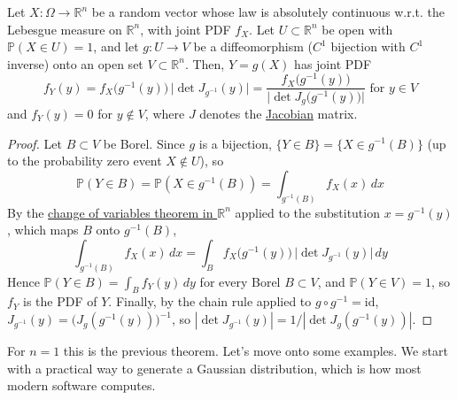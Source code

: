   \begin{theorem}
    \label{thm:density-of-a-multivariate-transformation}
    Let $X: \Omega \to \mathbb{R}^n$ be a random vector whose law is absolutely continuous w.r.t. the Lebesgue measure on $\mathbb{R}^n$, with joint PDF $f_{X}$. Let $U \subset \mathbb{R}^n$ be open with $\mathbb{P}(X \in U) = 1$, and let $g: U \to V$ be a diffeomorphism ($C^1$ bijection with $C^1$ inverse) onto an open set $V \subset \mathbb{R}^n$. Then, $Y = g(X)$ has joint PDF 
    \begin{equation}
      f_{Y} (y) = f_{X} \big( g^{-1} (y) \big) \, \big| \det J_{g^{-1}} (y) \big| = \frac{f_{X} \big( g^{-1} (y) \big)}{\big| \det J_g \big( g^{-1} (y) \big) \big|} \text{ for } y \in V
    \end{equation}
    and $f_{Y} (y) = 0$ for $y \not\in V$, where $J$ denotes the \hyperref[mv-def:jacobian]{Jacobian} matrix. 
  \end{theorem}
  \begin{proof}
    Let $B \subset V$ be Borel. Since $g$ is a bijection, $\{Y \in B\} = \{X \in g^{-1}(B)\}$ (up to the probability zero event $X \notin U$), so 
    \begin{equation}
      \mathbb{P}(Y \in B) = \mathbb{P}(X \in g^{-1}(B)) = \int_{g^{-1}(B)} f_{X} (x) \,dx
    \end{equation}
    By the \hyperref[mv-thm:integration-over-change-of-bases-in-rn]{change of variables theorem in $\mathbb{R}^n$} applied to the substitution $x = g^{-1}(y)$, which maps $B$ onto $g^{-1}(B)$, 
    \begin{equation}
      \int_{g^{-1}(B)} f_{X} (x) \,dx = \int_B f_{X} \big( g^{-1} (y) \big) \, \big| \det J_{g^{-1}} (y) \big| \,dy
    \end{equation}
    Hence $\mathbb{P}(Y \in B) = \int_B f_{Y} (y) \,dy$ for every Borel $B \subset V$, and $\mathbb{P}(Y \in V) = 1$, so $f_{Y}$ is the PDF of $Y$. Finally, by the chain rule applied to $g \circ g^{-1} = \mathrm{id}$, $J_{g^{-1}} (y) = \big( J_g (g^{-1}(y)) \big)^{-1}$, so $|\det J_{g^{-1}} (y)| = 1 / |\det J_g (g^{-1}(y))|$. 
  \end{proof}

  For $n = 1$ this is the previous theorem. Let's move onto some examples. We start with a practical way to generate a Gaussian distribution, which is how most modern software computes. 

